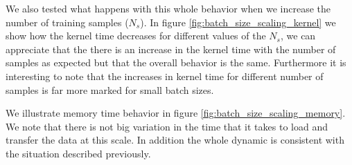 \documentclass[11pt,a4paper]{article}
\begin{document}
We also tested what happens with this whole behavior when we increase the number of
training samples ($N_s$). In figure \ref{fig:batch_size_scaling_kernel} we show 
how the kernel time decreases for different values of the $N_s$, 
we can appreciate that the there is an increase in the kernel time with the 
number of samples as expected but that the overall behavior is the same. 
Furthermore it is interesting to note that the increases in kernel 
time for different number of samples is far more marked for small batch sizes. 

We illustrate memory time behavior in figure \ref{fig:batch_size_scaling_memory}. We note that there is not big variation in the time that it takes to load and transfer the data at this scale. In addition the whole dynamic is consistent with the situation described previously. 

\end{document}
